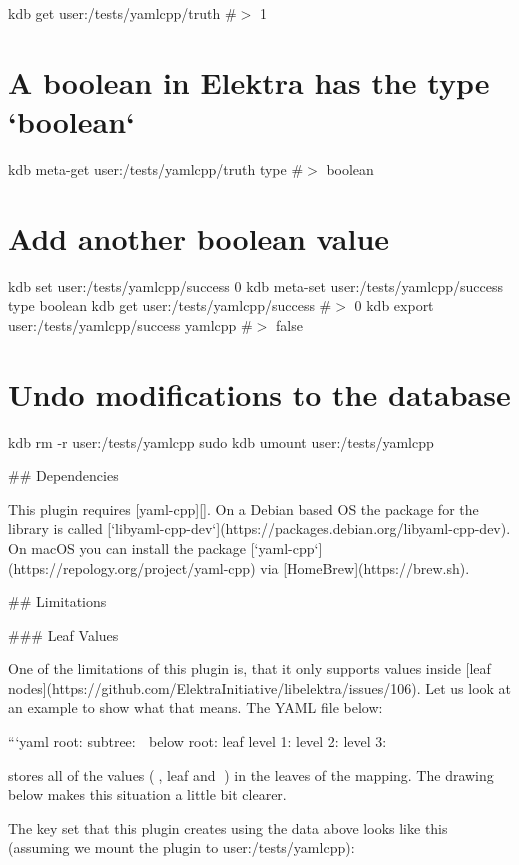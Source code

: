 kdb get user\+:/tests/yamlcpp/truth \#$>$ 1\hypertarget{autotoc_md817_autotoc_md887}{}\section{A boolean in Elektra has the type `boolean`}\label{autotoc_md817_autotoc_md887}
kdb meta-\/get user\+:/tests/yamlcpp/truth type \#$>$ boolean\hypertarget{autotoc_md817_autotoc_md888}{}\section{Add another boolean value}\label{autotoc_md817_autotoc_md888}
kdb set user\+:/tests/yamlcpp/success 0 kdb meta-\/set user\+:/tests/yamlcpp/success type boolean kdb get user\+:/tests/yamlcpp/success \#$>$ 0 kdb export user\+:/tests/yamlcpp/success yamlcpp \#$>$ false\hypertarget{autotoc_md817_autotoc_md889}{}\section{Undo modifications to the database}\label{autotoc_md817_autotoc_md889}
kdb rm -\/r user\+:/tests/yamlcpp sudo kdb umount user\+:/tests/yamlcpp 
\begin{DoxyCode}
## Dependencies

This plugin requires [yaml-cpp][]. On a Debian based OS the package for the library is called
       [`libyaml-cpp-dev`](https://packages.debian.org/libyaml-cpp-dev). On macOS you can install the package
       [`yaml-cpp`](https://repology.org/project/yaml-cpp) via [HomeBrew](https://brew.sh).

## Limitations

### Leaf Values

One of the limitations of this plugin is, that it only supports values inside [leaf
       nodes](https://github.com/ElektraInitiative/libelektra/issues/106). Let us look at an example to show what that means. The YAML
       file below:

```yaml
root:
  subtree: 🍂
  below root: leaf
level 1:
  level 2:
    level 3: 🍁
\end{DoxyCode}


stores all of the values ({\ttfamily 🍂}, {\ttfamily leaf} and {\ttfamily 🍁}) in the leaves of the mapping. The drawing below makes this situation a little bit clearer.



The key set that this plugin creates using the data above looks like this (assuming we mount the plugin to {\ttfamily user\+:/tests/yamlcpp})\+:

